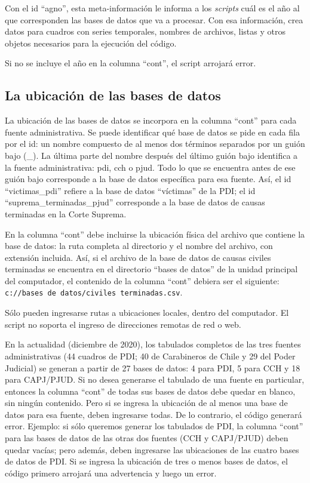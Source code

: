 \documentclass[
  spanish,
]{book}
\begin{document}
Con el id ``agno'', esta meta-información le informa a los \emph{scripts} cuál es el año al que corresponden las bases de datos que va a procesar. Con esa información, crea datos para cuadros con series temporales, nombres de archivos, listas y otros objetos necesarios para la ejecución del código.

Si no se incluye el año en la columna ``cont'', el script arrojará error.

\hypertarget{la-ubicaciuxf3n-de-las-bases-de-datos}{%
\subsection{La ubicación de las bases de datos}\label{la-ubicaciuxf3n-de-las-bases-de-datos}}

La ubicación de las bases de datos se incorpora en la columna ``cont'' para cada fuente administrativa. Se puede identificar qué base de datos se pide en cada fila por el id: un nombre compuesto de al menos dos términos separados por un guión bajo (\_). La última parte del nombre después del último guión bajo identifica a la fuente administrativa: pdi, cch o pjud. Todo lo que se encuentra antes de ese guión bajo corresponde a la base de datos específica para esa fuente. Así, el id ``victimas\_pdi'' refiere a la base de datos ``víctimas'' de la PDI; el id ``suprema\_terminadas\_pjud'' corresponde a la base de datos de causas terminadas en la Corte Suprema.

En la columna ``cont'' debe incluirse la ubicación física del archivo que contiene la base de datos: la ruta completa al directorio y el nombre del archivo, con extensión incluida. Así, si el archivo de la base de datos de causas civiles terminadas se encuentra en el directorio ``bases de datos'' de la unidad principal del computador, el contenido de la columna ``cont'' debiera ser el siguiente: \texttt{c://bases\ de\ datos/civiles\ terminadas.csv}.

Sólo pueden ingresarse rutas a ubicaciones locales, dentro del computador. El script no soporta el ingreso de direcciones remotas de red o web.

En la actualidad (diciembre de 2020), los tabulados completos de las tres fuentes administrativas (44 cuadros de PDI; 40 de Carabineros de Chile y 29 del Poder Judicial) se generan a partir de 27 bases de datos: 4 para PDI, 5 para CCH y 18 para CAPJ/PJUD. Si no desea generarse el tabulado de una fuente en particular, entonces la columna ``cont'' de todas sus bases de datos debe quedar en blanco, sin ningún contenido. Pero si se ingresa la ubicación de al menos una base de datos para esa fuente, deben ingresarse todas. De lo contrario, el código generará error. Ejemplo: si sólo queremos generar los tabulados de PDI, la columna ``cont'' para las bases de datos de las otras dos fuentes (CCH y CAPJ/PJUD) deben quedar vacías; pero además, deben ingresarse las ubicaciones de las cuatro bases de datos de PDI. Si se ingresa la ubicación de tres o menos bases de datos, el código primero arrojará una advertencia y luego un error.
\end{document}
